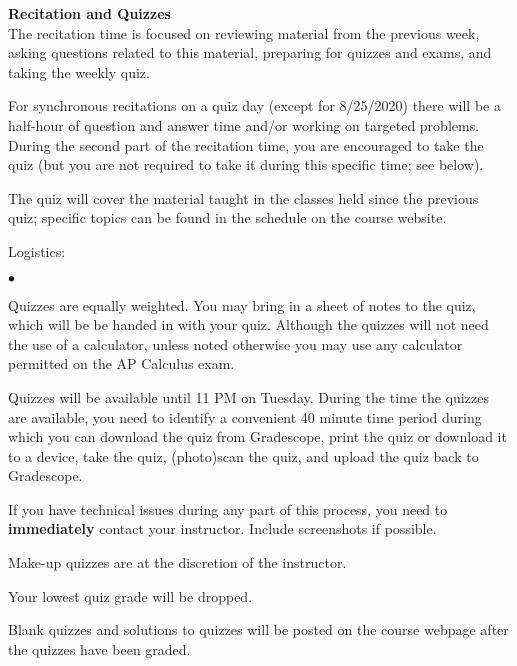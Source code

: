 \documentclass[12pt]{article}
\renewcommand{\emph}[1]{\textsf{\textbf{#1}}}
\newcommand{\localhead}[1]{\par\smallskip\textbf{#1}\nobreak\\}%
\def\heading#1{\localhead{\large\emph{#1}}}
\newenvironment{clist}%
{\bgroup\parskip 0pt\begin{list}{$\bullet$}{\partopsep 4pt\topsep 0pt\itemsep -2pt}}%
{\end{list}\egroup}%
\begin{document}
\heading{Recitation and Quizzes}
The recitation time is focused on reviewing material from the previous week, asking questions related to this material, preparing for quizzes and exams, and taking the weekly quiz.

For synchronous recitations on a quiz day (except for 8/25/2020) there will be a half-hour of question and answer time and/or working on targeted problems. During the second part of the recitation time, you are encouraged to take the quiz (but you are not required to take it during this specific time; see below).

The quiz will cover the material taught in the classes held since the previous quiz; specific topics can be found in the schedule on the course website.  

Logistics:

\begin{clist}
\item Quizzes are equally weighted.  You may bring in a sheet of notes to the quiz, which will be be handed in with your quiz. Although the quizzes will not need the use of a calculator, unless noted otherwise
you may use any calculator permitted on the AP Calculus exam.


\item Quizzes will be available until 11 PM on Tuesday. During the time the quizzes are available, you need to identify a convenient 40 minute time period during which you can download the quiz from  Gradescope, print the quiz or download it to a device, take the quiz, (photo)scan the quiz, and upload the quiz back to Gradescope. 
\item If you have technical issues during any part of this process, you need to \emph{immediately} contact your instructor. Include screenshots if possible.
\item Make-up quizzes are at the discretion of the instructor.
\item Your lowest quiz grade will be dropped. 
\end{clist}

Blank quizzes and solutions to quizzes will be posted on the course webpage after the quizzes have been graded.
\end{document}
